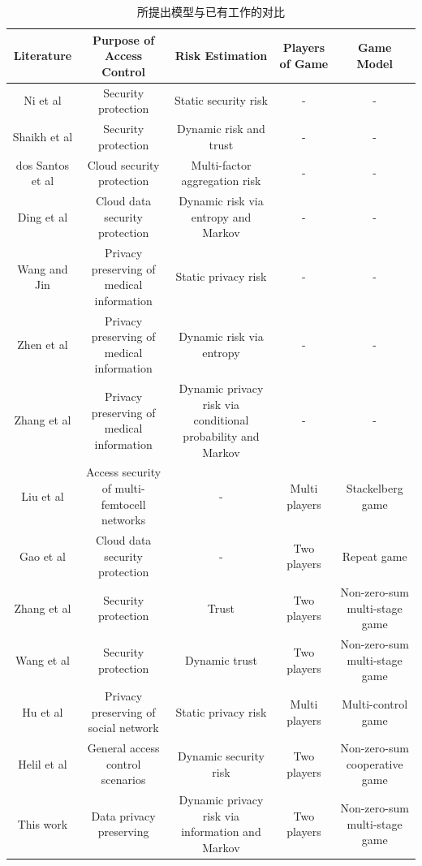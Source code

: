 \begin{table}[htb]
	
	\caption{所提出模型与已有工作的对比}\label{tab:comparison}
	\centering 
	\tiny
	\begin{tabular}{ccccc}
		\toprule
		Literature & Purpose of Access Control & Risk Estimation & Players of Game & Game Model \\
		\hline
		Ni et al\cite{ni2010risk} & Security protection &Static security risk&-&-\\ 
		Shaikh et al\cite{shaikh2012dynamic} & Security protection & Dynamic risk and trust &-&-\\
		dos Santos et al\cite{santos2016} &Cloud security protection & Multi-factor aggregation risk &-&-\\
		Ding et al\cite{ding2019} & Cloud  data security protection& Dynamic risk via entropy and Markov & - & -\\
		Wang and Jin\cite{wang2011quantified} & Privacy preserving of medical information & Static privacy risk &-&-\\
		Zhen et al\cite{zhen2015} & Privacy preserving of medical information& Dynamic risk via entropy & - & -\\
		Zhang et al\cite{zhang2018privacy} & Privacy preserving of medical information& Dynamic privacy risk via conditional probability  and Markov &-&-\\
		Liu et al\cite{liu2016dynamic} & Access security of multi-femtocell networks&-&	Multi players&	Stackelberg game\\
		Gao et al\cite{gao2018game} & Cloud  data security protection& -&	Two players &Repeat game\\
		Zhang et al\cite{zhang2015towards} & Security protection& Trust & Two players & Non-zero-sum multi-stage game\\
		Wang et al\cite{wang2019} & Security protection& Dynamic trust & Two players & Non-zero-sum multi-stage game\\
		Hu et al\cite{hu2014game} & Privacy preserving of social network&Static privacy risk&Multi players&	Multi-control game\\
		Helil et al\cite{helil2017non} & General access control scenarios&Dynamic security risk&Two players&Non-zero-sum cooperative game\\
		This work & Data privacy preserving& Dynamic privacy risk via information and Markov & Two players & Non-zero-sum multi-stage game\\
		\bottomrule 
	\end{tabular}
\end{table}



